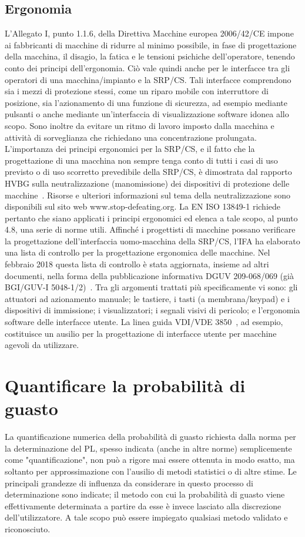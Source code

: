 \subsection{Ergonomia}
\label{subsec:06-1-3}
L'Allegato I, punto 1.1.6, della Direttiva Macchine europea 2006/42/CE impone ai fabbricanti di macchine di ridurre al minimo possibile, in fase di progettazione della macchina, il disagio, la fatica e le tensioni psichiche dell'operatore, tenendo conto dei principi dell'ergonomia. Ciò vale quindi anche per le interfacce tra gli operatori di una macchina/impianto e la SRP/CS. Tali interfacce comprendono sia i mezzi di protezione stessi, come un riparo mobile con interruttore di posizione, sia l'azionamento di una funzione di sicurezza, ad esempio mediante pulsanti o anche mediante un'interfaccia di visualizzazione software idonea allo scopo. Sono inoltre da evitare un ritmo di lavoro imposto dalla macchina e attività di sorveglianza che richiedano una concentrazione prolungata.
L'importanza dei principi ergonomici per la SRP/CS, e il fatto che la progettazione di una macchina non sempre tenga conto di tutti i casi di uso previsto o di uso scorretto prevedibile della SRP/CS, è dimostrata dal rapporto HVBG sulla neutralizzazione (manomissione) dei dispositivi di protezione delle macchine~\cite{apfeld2006}. Risorse e ulteriori informazioni sul tema della neutralizzazione sono disponibili sul sito web www.stop-defeating.org.
La EN ISO 13849-1 richiede pertanto che siano applicati i principi ergonomici ed elenca a tale scopo, al punto 4.8, una serie di norme utili. Affinché i progettisti di macchine possano verificare la progettazione dell'interfaccia uomo-macchina della SRP/CS, l'IFA ha elaborato una lista di controllo per la progettazione ergonomica delle macchine. Nel febbraio 2018 questa lista di controllo è stata aggiornata, insieme ad altri documenti, nella forma della pubblicazione informativa DGUV 209-068/069 (già BGI/GUV-I 5048-1/2)~\cite{dguv209-068}. Tra gli argomenti trattati più specificamente vi sono: gli attuatori ad azionamento manuale; le tastiere, i tasti (a membrana/keypad) e i dispositivi di immissione; i visualizzatori; i segnali visivi di pericolo; e l'ergonomia software delle interfacce utente. La linea guida VDI/VDE 3850~\cite{vdi3850}, ad esempio, costituisce un ausilio per la progettazione di interfacce utente per macchine agevoli da utilizzare.

\section{Quantificare la probabilità di guasto}
\label{sec:06-2}
La quantificazione numerica della probabilità di guasto richiesta dalla norma per la determinazione del PL, spesso indicata (anche in altre norme) semplicemente come "quantificazione", non può a rigore mai essere ottenuta in modo esatto, ma soltanto per approssimazione con l'ausilio di metodi statistici o di altre stime. Le principali grandezze di influenza da considerare in questo processo di determinazione sono indicate; il metodo con cui la probabilità di guasto viene effettivamente determinata a partire da esse è invece lasciato alla discrezione dell'utilizzatore. A tale scopo può essere impiegato qualsiasi metodo validato e riconosciuto.

